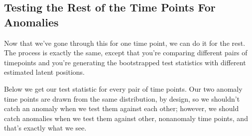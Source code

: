 \documentclass[letterpaper,10pt,english]{jupyterBook}
\begin{document}
\subsection{Testing the Rest of the Time Points For Anomalies}
\label{\detokenize{applications/ch10/anomaly-detection:testing-the-rest-of-the-time-points-for-anomalies}}
\sphinxAtStartPar
Now that we’ve gone through this for one time point, we can do it for the rest. The process is exactly the same, except that you’re comparing different pairs of timepoints and you’re generating the bootstrapped test statistics with different estimated latent positions.

\sphinxAtStartPar
Below we get our test statistic for every pair of time points. Our two anomaly time points are drawn from the same distribution, by design, so we shouldn’t catch an anomaly when we test them against each other; however, we should catch anomalies when we test them against other, non\sphinxhyphen{}anomaly time points, and that’s exactly what we see.

\begin{sphinxVerbatim}[commandchars=\\\{\}]
  
    \PYG{p}{[}\PYG{p}{]}
      \PYG{p}{[} \PYG{p}{[}\PYG{p}{]}\PYG{p}{]}
    \PYG{p}{[}\PYG{p}{]}  
\end{sphinxVerbatim}
\end{document}
